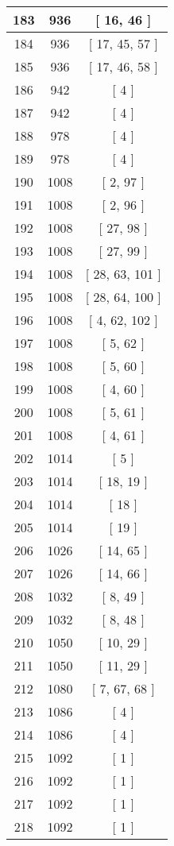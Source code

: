 \begin{center}
\begin{longtable}[H]{|| c c c ||}
\hline
183 & 936 & [ 16, 46 ] \\ 
\hline
184 & 936 & [ 17, 45, 57 ] \\ 
\hline
185 & 936 & [ 17, 46, 58 ] \\ 
\hline
186 & 942 & [ 4 ] \\ 
\hline
187 & 942 & [ 4 ] \\ 
\hline
188 & 978 & [ 4 ] \\ 
\hline
189 & 978 & [ 4 ] \\ 
\hline
190 & 1008 & [ 2, 97 ] \\ 
\hline
191 & 1008 & [ 2, 96 ] \\ 
\hline
192 & 1008 & [ 27, 98 ] \\ 
\hline
193 & 1008 & [ 27, 99 ] \\ 
\hline
194 & 1008 & [ 28, 63, 101 ] \\ 
\hline
195 & 1008 & [ 28, 64, 100 ] \\ 
\hline
196 & 1008 & [ 4, 62, 102 ] \\ 
\hline
197 & 1008 & [ 5, 62 ] \\ 
\hline
198 & 1008 & [ 5, 60 ] \\ 
\hline
199 & 1008 & [ 4, 60 ] \\ 
\hline
200 & 1008 & [ 5, 61 ] \\ 
\hline
201 & 1008 & [ 4, 61 ] \\ 
\hline
202 & 1014 & [ 5 ] \\ 
\hline
203 & 1014 & [ 18, 19 ] \\ 
\hline
204 & 1014 & [ 18 ] \\ 
\hline
205 & 1014 & [ 19 ] \\ 
\hline
206 & 1026 & [ 14, 65 ] \\ 
\hline
207 & 1026 & [ 14, 66 ] \\ 
\hline
208 & 1032 & [ 8, 49 ] \\ 
\hline
209 & 1032 & [ 8, 48 ] \\ 
\hline
210 & 1050 & [ 10, 29 ] \\ 
\hline
211 & 1050 & [ 11, 29 ] \\ 
\hline
212 & 1080 & [ 7, 67, 68 ] \\ 
\hline
213 & 1086 & [ 4 ] \\ 
\hline
214 & 1086 & [ 4 ] \\ 
\hline
215 & 1092 & [ 1 ] \\ 
\hline
216 & 1092 & [ 1 ] \\ 
\hline
217 & 1092 & [ 1 ] \\ 
\hline
218 & 1092 & [ 1 ] \\ 

\end{longtable}
\end{center}
